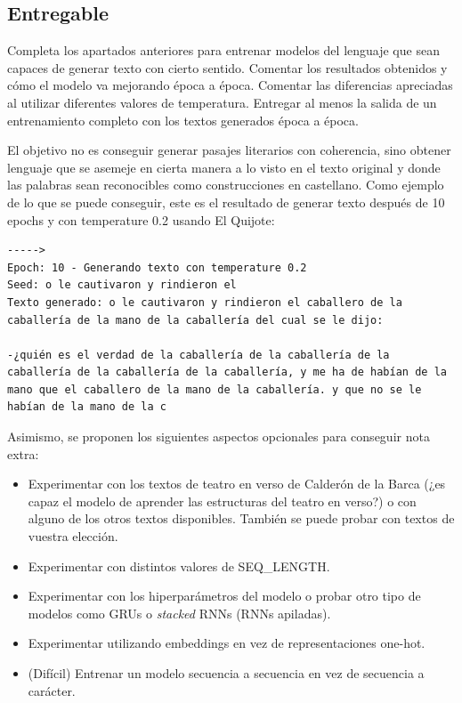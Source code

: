 \documentclass[11pt]{article}
\providecommand{\tightlist}{%
      \setlength{\itemsep}{0pt}\setlength{\parskip}{0pt}}
\begin{document}
    \subsection{Entregable}\label{entregable}

Completa los apartados anteriores para entrenar modelos del lenguaje que
sean capaces de generar texto con cierto sentido. Comentar los
resultados obtenidos y cómo el modelo va mejorando época a época.
Comentar las diferencias apreciadas al utilizar diferentes valores de
temperatura. Entregar al menos la salida de un entrenamiento completo
con los textos generados época a época.

El objetivo no es conseguir generar pasajes literarios con coherencia,
sino obtener lenguaje que se asemeje en cierta manera a lo visto en el
texto original y donde las palabras sean reconocibles como
construcciones en castellano. Como ejemplo de lo que se puede conseguir,
este es el resultado de generar texto después de 10 
epochs y con
temperature 0.2 usando El Quijote:

\begin{verbatim}
-----> 
Epoch: 10 - Generando texto con temperature 0.2
Seed: o le cautivaron y rindieron el
Texto generado: o le cautivaron y rindieron el caballero de la caballería de la mano de la caballería del cual se le dijo:

-¿quién es el verdad de la caballería de la caballería de la caballería de la caballería de la caballería, y me ha de habían de la mano que el caballero de la mano de la caballería. y que no se le habían de la mano de la c
\end{verbatim}

Asimismo, se proponen los siguientes aspectos opcionales para conseguir
nota extra:

\begin{itemize}
\tightlist
\item
  Experimentar con los textos de teatro en verso de Calderón de la Barca
  (¿es capaz el modelo de aprender las estructuras del teatro en verso?)
  o con alguno de los otros textos disponibles. También se puede probar
  con textos de vuestra elección.
\item
  Experimentar con distintos valores de SEQ\_LENGTH.
\item
  Experimentar con los hiperparámetros del modelo o probar otro tipo de
  modelos como GRUs o \emph{stacked} RNNs (RNNs apiladas).
\item
  Experimentar utilizando embeddings en vez de representaciones one-hot.
\item
  (Difícil) Entrenar un modelo secuencia a secuencia en vez de secuencia
  a carácter.
\end{itemize}


    
    
    
\end{document}
